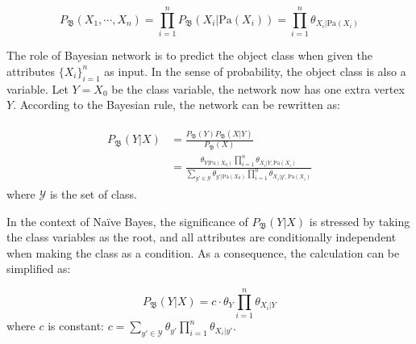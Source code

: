 \begin{equation}\label{eq:BNOri}
P_\mathfrak{B}(X_1, \cdots, X_n) = 
\prod_{i=1}^{n} P_\mathfrak{B}(X_i| \text{Pa}{(X_i)})=
\prod_{i=1}^{n} \theta_{X_i | \text{Pa}(X_i)}
\end{equation}
\vspace{-1ex}

The role of Bayesian network is to predict the object class when given the attributes $\{X_i\}_{i=1}^n$ as input. In the sense of probability, the object class is also a variable.
Let $Y=X_0$  be the class variable, the network now has one extra vertex $Y$.
According to the Bayesian rule, the network can be rewritten as:

\vspace{-1ex}
\begin{align}\label{eq:BNWithCls}
\begin{split}
P_\mathfrak{B}(Y|{X}) & = 
\frac{ P_\mathfrak{B}(Y) P_\mathfrak{B}({X}|Y) }{P_\mathfrak{B}({X})}\\
&=\frac{ \theta_{Y|\text{Pa}({X}_0)} \prod_{i=1}^{n} \theta_{X_i|Y, \text{Pa}({X}_i)} }{ \sum_{y'\in \mathcal{Y}} \theta_{y'|\text{Pa}({X}_0)} \prod_{i=1}^{n} \theta_{X_i|y', \text{Pa}({X}_i)} }
\end{split}
\end{align}
where $\mathcal{Y}$ is the set of class.

In the context of Na\"{i}ve Bayes, 
the significance of $P_\mathfrak{B}(Y|{X})$ is stressed by taking the class variables as the root, and all attributes are conditionally independent when making the class as a condition. As a consequence, the calculation can be simplified as:

\begin{equation}\label{eq:BN-naiveBayes}
P_\mathfrak{B}(Y| {X}) = c \cdot \theta_Y \prod_{i=1}^{n}\theta_{X_i|Y}
\end{equation}
where $c$ is constant: $c=\sum_{y'\in \mathcal{Y}}  \theta_{y'} \prod_{i=1}^{n}\theta_{X_i|y'}$.

